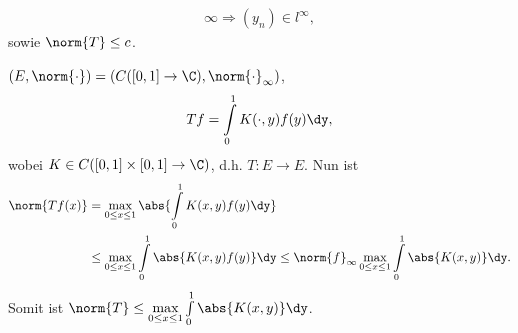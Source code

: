 \begin{bsp}
\begin{bspenum}
\begin{align*}
\infty \Rightarrow (y_n)\in l^\infty,
\end{align*}
sowie $\norm{T}\le c$.
\item $(E,\norm{\cdot}) = (C([0,1]\to\C),\norm{\cdot}_\infty)$,
\begin{align*}
Tf = \int\limits_0^1 K(\cdot,y)f(y)\dy,
\end{align*}
wobei $K\in C([0,1]\times[0,1]\to\C)$, d.h. $T: E\to E$. Nun ist
\begin{align*}
\norm{Tf(x)} &= \max\limits_{0\le x\le 1} \abs{\int\limits_0^1 K(x,y)f(y)\dy}
\\ 
&\le \max\limits_{0\le x\le 1}\int\limits_0^1  \abs{K(x,y)f(y)} \dy \le
\norm{f}_\infty \max\limits_{0\le x\le 1} \int\limits_{0}^1 \abs{K(x,y)}\dy.
\end{align*}
Somit ist $\norm{T} \le \max\limits_{0\le x\le 1} \int\limits_0^1
\abs{K(x,y)}\dy$.\bsphere
\end{bspenum}
\end{bsp}


